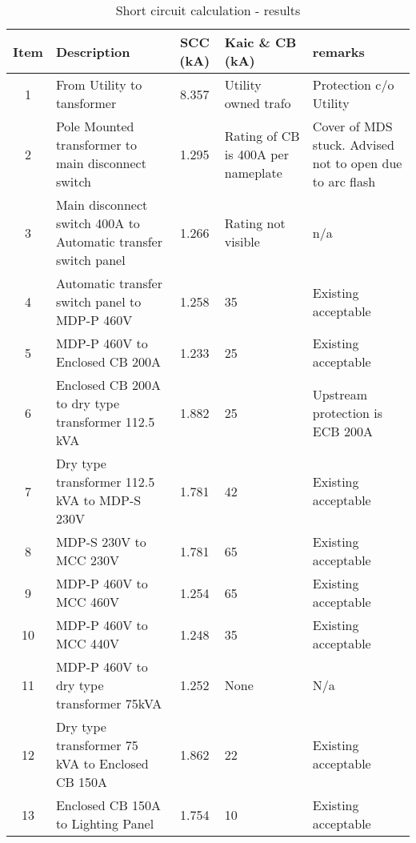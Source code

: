 \begin{table}[!htb]
	\caption{Short circuit calculation - results}
	\label{tbl_ch04_elecaudit_scc}
	{\scriptsize
		
	\begin{tabular}{c|p{4cm}|c|p{3cm}|p{5cm}}
\hline
Item & Description & SCC (kA) & Kaic \& CB (kA) & remarks \\ 
\hline
1 & From Utility to tansformer & 8.357 & Utility owned trafo & Protection c/o Utility \\ 
2 & Pole Mounted transformer to main disconnect switch & 1.295 & Rating of CB is 400A per nameplate & Cover of MDS stuck. Advised not to open due to arc flash \\ 
3 & Main disconnect switch 400A to Automatic transfer switch panel & 1.266 & Rating not visible & n/a \\ 
4 & Automatic transfer switch panel to MDP-P 460V & 1.258 & 35 & Existing acceptable \\ 
5 & MDP-P 460V to Enclosed CB 200A & 1.233 & 25 & Existing acceptable \\ 
6 & Enclosed CB 200A to dry type transformer 112.5 kVA & 1.882 & 25 & Upstream protection is ECB 200A \\ 
7 & Dry type transformer 112.5 kVA to MDP-S 230V & 1.781 & 42 & Existing acceptable \\ 
8 & MDP-S 230V to MCC 230V & 1.781 & 65 & Existing acceptable \\ 
9 & MDP-P 460V to MCC 460V & 1.254 & 65 & Existing acceptable \\ 
10 & MDP-P 460V to MCC 440V & 1.248 & 35 & Existing acceptable \\ 
11 & MDP-P 460V to dry type transformer 75kVA & 1.252 & None & N/a \\ 
12 & Dry type transformer 75 kVA to Enclosed CB 150A  & 1.862 & 22 & Existing acceptable \\ 
13 & Enclosed CB 150A  to Lighting Panel & 1.754 & 10 & Existing acceptable \\ 
\hline
	\end{tabular}
	}%
\end{table}